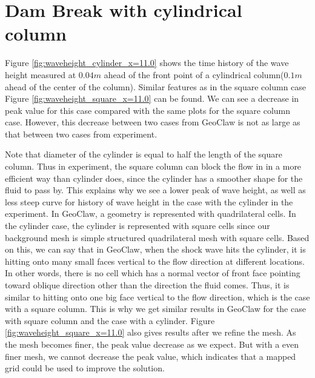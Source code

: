 \documentclass[11pt]{article}
\begin{document}
\section{Dam Break with cylindrical column}\label{Sec:Cylinder}
Figure \ref{fig:waveheight_cylinder_x=11.0} shows the time history of the wave height measured at $0.04m$ ahead of the front point of a cylindrical column($0.1m$ ahead of the center of the column).
Similar features as in the square column case Figure \ref{fig:waveheight_square_x=11.0} can be found.
We can see a decrease in peak value for this case compared with the same plots for the square column case. However, this decrease between two cases from GeoClaw is not as large as that between two cases from experiment. 
\par
Note that diameter of the cylinder is equal to half the length of the square column. 
Thus in experiment, the square column can block the flow in in a more efficient way than cylinder does, since the cylinder has a smoother shape for the fluid to pass by. 
This explains why we see a lower peak of wave height, as well as less steep curve for history of wave height in the case with the cylinder in the experiment. 
In GeoClaw, a geometry is represented with quadrilateral cells. 
In the cylinder case, the cylinder is represented with square cells since our background mesh is simple structured quadrilateral mesh with square cells.
Based on this, we can say that in GeoClaw, when the shock wave hits the cylinder, it is hitting onto many small faces vertical to the flow direction at different locations. 
In other words, there is no cell which has a normal vector of front face pointing toward oblique direction other than the direction the fluid comes.  
Thus, it is similar to hitting onto one big face vertical to the flow direction, which is the case with a square column.  
This is why we get similar results in GeoClaw for the case with square column and the case with a cylinder.
Figure \ref{fig:waveheight_square_x=11.0} also gives results after we refine the mesh. As the mesh becomes finer, the peak value decrease as we expect.
But with a even finer mesh, we cannot decrease the peak value, which indicates that a mapped grid could be used to improve the solution.
\end{document}

